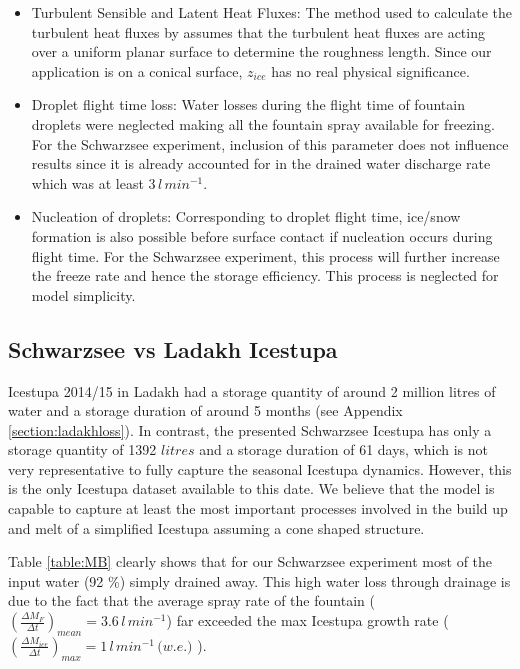 \documentclass[utf8]{frontiersSCNS} %
\begin{document}
\begin{itemize}

\item  Turbulent Sensible and Latent Heat Fluxes: The method used to calculate
  the turbulent heat fluxes by \cite{Garratt_1992} assumes that the turbulent
  heat fluxes are acting over a uniform planar surface to determine the
  roughness length. Since our application is on a conical surface, $z_{ice}$
  has no real physical significance.

\item Droplet flight time loss: Water losses during the flight time of
  fountain droplets were neglected making all the fountain spray available for
  freezing. For the Schwarzsee experiment, inclusion of this parameter does
  not influence results since it is already accounted for in the drained water
  discharge rate which was at least $3\, l\,min^{-1}$.

\item Nucleation of droplets: Corresponding to droplet flight time, ice/snow
  formation is also possible before surface contact if nucleation occurs
  during flight time. For the Schwarzsee experiment, this process will further
  increase the freeze rate and hence the storage efficiency. This process is
  neglected for model simplicity.

\end{itemize}

\subsection{Schwarzsee vs Ladakh Icestupa} Icestupa 2014/15 in Ladakh had a
storage quantity of around 2 million litres of water and a storage duration of
around 5 months (see Appendix \ref{section:ladakhloss}). In contrast, the
presented Schwarzsee Icestupa has only a storage quantity of 1392 $litres$ and
a storage duration of 61 days, which is not very representative to fully
capture the seasonal Icestupa dynamics. However, this is the only Icestupa
dataset available to this date. We believe that the model is capable to
capture at least the most important processes involved in the build up and
melt of a simplified Icestupa assuming a cone shaped structure.

Table \ref{table:MB} clearly shows that for our Schwarzsee experiment most of
the input water (92 \%) simply drained away. This high water loss through
drainage is due to the fact that the average spray rate of the fountain
($(\frac{\Delta M_{F}}{\Delta t})_{mean} = 3.6\, l\,min^{-1}$) far exceeded
the max Icestupa growth rate ($(\frac{\Delta M_{ice}}{\Delta t})_{max} = 1\,
l\,min^{-1}\, \textit{(w.e.)}$ ).
\end{document}
